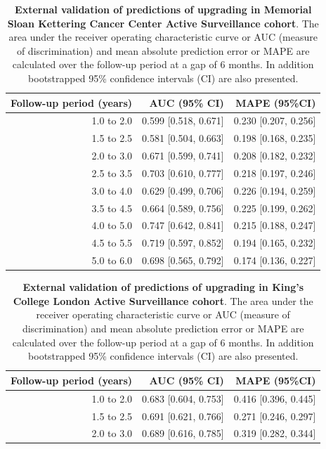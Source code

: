 \begin{subappendices}
\begin{table}
\small
\centering
\caption{\textbf{External validation of predictions of upgrading in Memorial Sloan Kettering Cancer Center Active Surveillance cohort}. The area under the receiver operating characteristic curve or AUC (measure of discrimination) and mean absolute prediction error or MAPE are calculated over the follow-up period at a gap of 6 months. In addition bootstrapped 95\% confidence intervals (CI) are also presented.}
\label{c5:tab:AUC_PE_MSKCC}
\begin{tabular}{r|r|r}
\hline
\hline
Follow-up period (years) & AUC (95\% CI) & MAPE (95\%CI)\\ 
\hline
1.0 to 2.0 & 0.599 [0.518, 0.671]  & 0.230 [0.207, 0.256]\\
1.5 to 2.5 & 0.581 [0.504, 0.663]  & 0.198 [0.168, 0.235]\\
2.0 to 3.0 & 0.671 [0.599, 0.741]  & 0.208 [0.182, 0.232]\\
2.5 to 3.5 & 0.703 [0.610, 0.777]  & 0.218 [0.197, 0.246]\\
3.0 to 4.0 & 0.629 [0.499, 0.706]  & 0.226 [0.194, 0.259]\\
3.5 to 4.5 & 0.664 [0.589, 0.756]  & 0.225 [0.199, 0.262]\\
4.0 to 5.0 & 0.747 [0.642, 0.841]  & 0.215 [0.188, 0.247]\\
4.5 to 5.5 & 0.719 [0.597, 0.852]  & 0.194 [0.165, 0.232]\\
5.0 to 6.0 & 0.698 [0.565, 0.792]  & 0.174 [0.136, 0.227]\\
\hline
\end{tabular}    
\end{table}

\begin{table}
\small
\centering
\caption{\textbf{External validation of predictions of upgrading in King's College London Active Surveillance cohort}. The area under the receiver operating characteristic curve or AUC (measure of discrimination) and mean absolute prediction error or MAPE are calculated over the follow-up period at a gap of 6 months. In addition bootstrapped 95\% confidence intervals (CI) are also presented.}
\label{c5:tab:AUC_PE_KCL}
\begin{tabular}{r|r|r}
\hline
\hline
Follow-up period (years) & AUC (95\% CI) & MAPE (95\%CI)\\ 
\hline
1.0 to 2.0 & 0.683 [0.604, 0.753] & 0.416 [0.396, 0.445] \\
1.5 to 2.5 & 0.691 [0.621, 0.766] & 0.271 [0.246, 0.297] \\
2.0 to 3.0 & 0.689 [0.616, 0.785] & 0.319 [0.282, 0.344] \\
\hline
\end{tabular}    
\end{table}


\end{subappendices}
